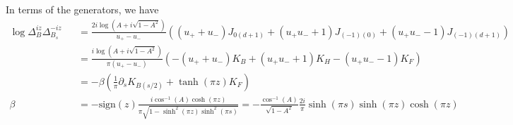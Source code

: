 \documentclass[a4paper,11pt]{article}
\theoremstyle{definition}
\newcommand{\nn}{\nonumber}
\newcommand{\lb}{\left(}
\newcommand{\rb}{\right)}
\newcommand{\p}{\partial}
\begin{document}
In terms of the generators, we have 
\begin{eqnarray}
    \log \Delta_{B}^{iz}\Delta_{B_s}^{-iz} &&=\frac{2i\log(A+i\sqrt{1-A^2})}{u_+-u_-} \left( (u_++u_-)J_{0(d+1)} + (u_+u_-+1)J_{(-1)(0)} + (u_+u_--1)J_{(-1)(d+1)}\right)\nn\\
    &&=\frac{i\log(A+i\sqrt{1-A^2})}{\pi(u_+-u_-)} \left( -(u_++u_-) K_B + (u_+u_-+1)K_H - (u_+u_--1) K_F\right)\nn\\
        &&=-\beta \lb\frac{1}{\pi}\p_sK_{B(s/2)} +\tanh(\pi z)K_F\rb\nn\\
        \beta&&=-\text{sign}(z)\frac{i\cos^{-1}(A)  \cosh{(\pi z)}}{\pi\sqrt{1-\sinh^2(\pi z)\sinh^2(\pi s)}} = -\frac{\cos^{-1}(A)}{\sqrt{1-A^2}} \frac{2i}{\pi}\sinh(\pi s)\sinh(\pi z)\cosh(\pi z)
\end{eqnarray}
\end{document}
